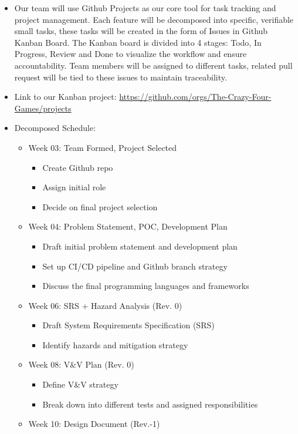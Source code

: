 \documentclass{article}
\begin{document}
\begin{itemize}
  \item Our team will use Github Projects as our core tool for task tracking and project management. Each feature will be decomposed into specific, verifiable small tasks, these tasks will be created in the form of Issues in Github Kanban Board. The Kanban board is divided into 4 stages: Todo, In Progress, Review and Done to visualize the workflow and ensure accountability. Team members will be assigned to different tasks, related pull request will be tied to these issues to maintain traceability.
  \item Link to our Kanban project: \url{https://github.com/orgs/The-Crazy-Four-Games/projects}
  \item Decomposed Schedule:
	\begin{itemize}
		\item Week 03: Team Formed, Project Selected
			\begin{itemize}
			\item Create Github repo
			\item Assign initial role
			\item Decide on final project selection
			\end{itemize}		
		\item Week 04: Problem Statement, POC, Development Plan
			\begin{itemize}
			\item Draft initial problem statement and development plan
			\item Set up CI/CD pipeline and Github branch strategy
			\item Discuss the final programming languages and frameworks
			\end{itemize}
		\item Week 06: SRS + Hazard Analysis (Rev. 0)
			\begin{itemize}
			\item Draft System Requirements Specification (SRS)
			\item Identify hazards and mitigation strategy
			\end{itemize}
		\item Week 08: V\&V Plan (Rev. 0)
			\begin{itemize}
			\item Define V\&V strategy
			\item Break down into different tests and assigned responsibilities
			\end{itemize}
		\item Week 10: Design Document (Rev.-1)

\end{itemize}
\end{itemize}
\end{document}
